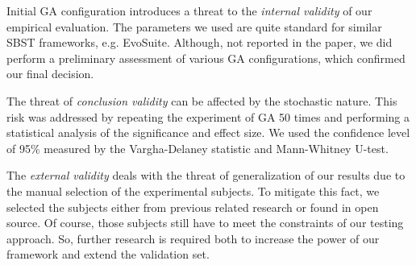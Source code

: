 Initial GA configuration introduces a threat to the \emph{internal validity} of our empirical evaluation. The parameters we used are quite standard for similar SBST frameworks, e.g. EvoSuite. Although, not reported in the paper, we did perform a preliminary assessment of various GA configurations, which confirmed our final decision.

The threat of \emph{conclusion validity} can be affected by the stochastic nature. This risk was addressed by repeating the experiment of GA 50 times and performing a statistical analysis of the significance and effect size. We used the confidence level of 95\% measured by the Vargha-Delaney statistic and Mann-Whitney U-test.

The \emph{external validity} deals with the threat of generalization of our results due to the manual selection of the experimental subjects. To mitigate this fact, we selected the subjects either from previous  related research or found in open source. Of course, those subjects still have to meet the constraints of our testing approach. So, further research is required both to increase the power of our framework and extend the validation set.
